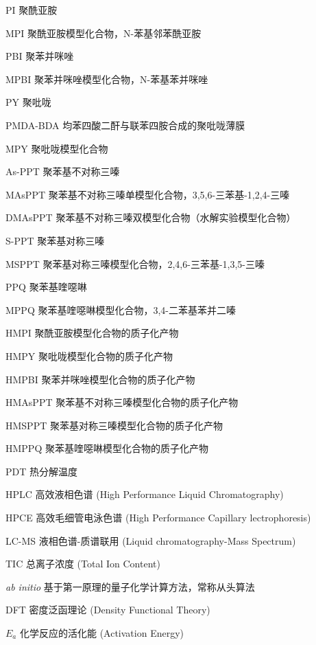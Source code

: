 \documentclass[degree=doctor]{thuthesis}
\begin{document}
\START
\showoutput

\frontmatter
\setcounter{page}{8}
\begin{denotation}[3cm]
  \item[PI] 聚酰亚胺
  \item[MPI] 聚酰亚胺模型化合物，N-苯基邻苯酰亚胺
  \item[PBI] 聚苯并咪唑
  \item[MPBI] 聚苯并咪唑模型化合物，N-苯基苯并咪唑
  \item[PY] 聚吡咙
  \item[PMDA-BDA] 均苯四酸二酐与联苯四胺合成的聚吡咙薄膜
  \item[MPY] 聚吡咙模型化合物
  \item[As-PPT] 聚苯基不对称三嗪
  \item[MAsPPT] 聚苯基不对称三嗪单模型化合物，3,5,6-三苯基-1,2,4-三嗪
  \item[DMAsPPT] 聚苯基不对称三嗪双模型化合物（水解实验模型化合物）
  \item[S-PPT] 聚苯基对称三嗪
  \item[MSPPT] 聚苯基对称三嗪模型化合物，2,4,6-三苯基-1,3,5-三嗪
  \item[PPQ] 聚苯基喹噁啉
  \item[MPPQ] 聚苯基喹噁啉模型化合物，3,4-二苯基苯并二嗪
  \item[HMPI] 聚酰亚胺模型化合物的质子化产物
  \item[HMPY] 聚吡咙模型化合物的质子化产物
  \item[HMPBI] 聚苯并咪唑模型化合物的质子化产物
  \item[HMAsPPT] 聚苯基不对称三嗪模型化合物的质子化产物
  \item[HMSPPT] 聚苯基对称三嗪模型化合物的质子化产物
  \item[HMPPQ] 聚苯基喹噁啉模型化合物的质子化产物
  \item[PDT] 热分解温度
  \item[HPLC] 高效液相色谱 (High Performance Liquid Chromatography)
  \item[HPCE] 高效毛细管电泳色谱 (High Performance Capillary lectrophoresis)
  \item[LC-MS] 液相色谱-质谱联用 (Liquid chromatography-Mass Spectrum)
  \item[TIC] 总离子浓度 (Total Ion Content)
  \item[\textit{ab initio}] 基于第一原理的量子化学计算方法，常称从头算法
  \item[DFT] 密度泛函理论 (Density Functional Theory)
  \item[$E_a$] 化学反应的活化能 (Activation Energy)

\end{denotation}
\end{document}
